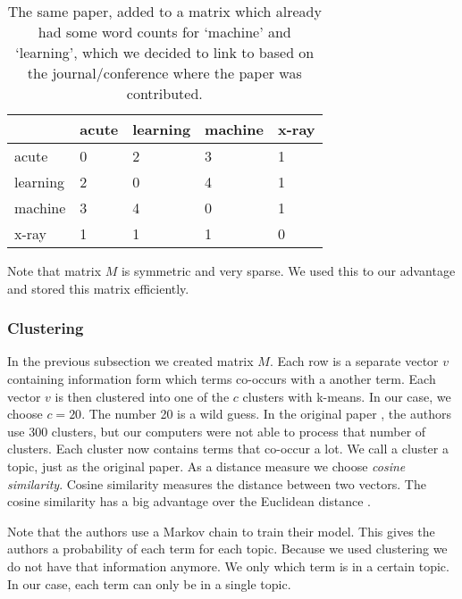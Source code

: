 \begin{table}
	\begin{center}

\begin{tabular}{|l|l|l|l|l|}
\hline
	 	& acute  & learning & machine &  x-ray \\ \hline
acute 	&	0 	& 	2 &	 3 &  1	 \\ \hline
learning&	2	&	0 &	 4 &  1	 \\ \hline
machine &	3	&	4 &	 0 &  1	 \\ \hline
x-ray	&	1	&	1 &	 1 &  0	 \\ \hline
\end{tabular} 

	\end{center}
\caption{The same paper, added to a matrix which already had some word counts for `machine' and `learning', which we decided to link to based on the journal/conference where the paper was contributed.}
	\label{tab:after}
\end{table}

Note that matrix $M$ is symmetric and very sparse. We used this to our advantage and stored this matrix efficiently.


\subsubsection*{Clustering}

In the previous subsection we created matrix $M$. Each row is a separate vector $v$ containing information form which terms co-occurs with a another term. Each vector $v$ is then clustered into one of the $c$ clusters with k-means. In our case, we choose  $c = 20$. The number 20 is a wild guess. In the original paper \cite{steyvers2004probabilistic}, the authors use 300 clusters, but our computers were not able to process that number of clusters. Each cluster now contains terms that co-occur a lot. We call a cluster a topic, just as the original paper. As a distance measure we choose \emph{cosine similarity}. Cosine similarity measures the distance between two vectors. The cosine similarity has a big advantage over the Euclidean distance \cite{chowdhury2010introduction}.  

Note that the authors use a Markov chain to train their model. This gives the authors a probability of each term for each topic. Because we used clustering we do not have that information anymore. We only which term is in a certain topic. In our case, each term can only be in a single topic.


